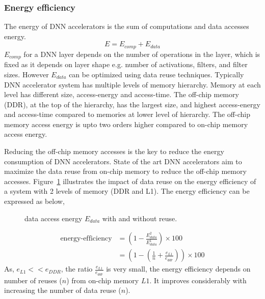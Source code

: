 \documentclass[a4paper,10pt]{article}
\begin{document}
\subsubsection{Energy efficiency}
The energy of DNN accelerators is the sum of computations and data accesses energy. 
\begin{equation}
	E=E_{comp} + E_{data}
\end{equation}
$E_{comp}$ for a DNN layer depends on the number of operations in the layer, which is fixed as it depends on layer shape e.g. number of activations, filters, and filter sizes. However $E_{data}$ can be optimized using data reuse techniques. Typically DNN accelerator system has multiple levels of memory hierarchy. Memory at each level has different size, access-energy and access-time. The off-chip memory (DDR), at the top of the hierarchy, has the largest size, and highest access-energy and access-time compared to memories at lower level of hierarchy.  The off-chip memory access energy is upto two orders higher compared to on-chip memory access energy. 

Reducing the off-chip memory accesses is the key to reduce the energy consumption of DNN accelerators. State of the art DNN accelerators aim to maximize the data reuse from on-chip memory to reduce the off-chip memory accesses. Figure~\ref{fig:dataAccessEnergy} illustrates the impact of data reuse on the energy efficiency of a system with 2 levels of memory (DDR and L1). The energy efficiency can be expressed as below,
\begin{figure}[!htb]
	\centering
	\hfil
	\caption{data access energy $E_{data}$ with and without reuse.}
	\label{fig:dataAccessEnergy}
	\vspace{-1.0em}	
\end{figure}
\begin{align*}
	\text{energy-efficiency} &= (1-\frac{E^2_{data}}{E^1_{data}})\times{100}\\
	&= (1-(\frac{1}{n}+\frac{e_{L1}}{e_{ddr}}))\times{100}
\end{align*}
As, $e_{L1} << e_{DDR}$, the ratio $\frac{e_{L1}}{e_{ddr}}$ is very small, the energy efficiency depends on number of reuses ($n$) from on-chip memory $L1$. It improves considerably with increasing the number of data reuse ($n$). 
\end{document}
